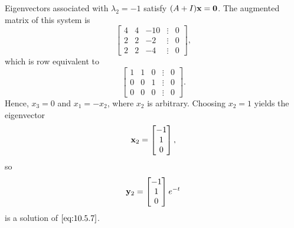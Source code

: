 \documentclass{ximera}
\begin{document}
\begin{example}
\begin{explanation}
Eigenvectors associated with $\lambda_2 =-1$ satisfy $(A+I){\bf
x}={\bf 0}$. The  augmented matrix of this system is
$$
\begin{bmatrix} 4 & 4 & -10 &\vdots & 0\\ 2 & 2 & -2 &
\vdots & 0\\2 & 2 & -4 &\vdots & 0\end{bmatrix},
$$
which is row equivalent to
$$
\begin{bmatrix} 1 & 1 & 0 &\vdots& 0\\ 0 & 0 & 1
&\vdots& 0
\\ 0 & 0 & 0 &\vdots&0\end{bmatrix}.
$$
Hence, $x_3=0$ and $x_1 =-x_2$, where $x_2$ is
arbitrary. Choosing $x_2=1$  yields the eigenvector
$$
{\bf x}_2=\begin{bmatrix}-1\\1\\0\end{bmatrix},
$$
so
$$
{\bf y}_2 =\begin{bmatrix}-1\\1\\0\end{bmatrix}e^{-t}
$$
is a solution of  $\eqref{eq:10.5.7}$.


\end{explanation}
\end{example}
\end{document}
